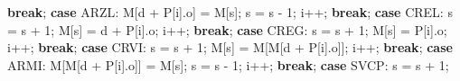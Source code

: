 \documentclass[
  brazilian,
  letterpaper,
]{book}
\newenvironment{Shaded}{\begin{snugshade}}{\end{snugshade}}
\newcommand{\ControlFlowTok}[1]{\textcolor[rgb]{0.00,0.23,0.31}{\textbf{#1}}}
\newcommand{\DecValTok}[1]{\textcolor[rgb]{0.68,0.00,0.00}{#1}}
\newcommand{\NormalTok}[1]{\textcolor[rgb]{0.00,0.23,0.31}{#1}}
\newcommand{\OperatorTok}[1]{\textcolor[rgb]{0.37,0.37,0.37}{#1}}
\theoremstyle{plain}
\theoremstyle{definition}
\theoremstyle{remark}
\begin{document}
\begin{Shaded}
\begin{Highlighting}[]
            \ControlFlowTok{break}\OperatorTok{;}
        \ControlFlowTok{case}\NormalTok{ ARZL}\OperatorTok{:}
\NormalTok{            M}\OperatorTok{[}\NormalTok{d }\OperatorTok{+}\NormalTok{ P}\OperatorTok{[}\NormalTok{i}\OperatorTok{].}\NormalTok{o}\OperatorTok{]} \OperatorTok{=}\NormalTok{ M}\OperatorTok{[}\NormalTok{s}\OperatorTok{];}
\NormalTok{            s }\OperatorTok{=}\NormalTok{ s }\OperatorTok{{-}} \DecValTok{1}\OperatorTok{;}
\NormalTok{            i}\OperatorTok{++;}
            \ControlFlowTok{break}\OperatorTok{;}
        \ControlFlowTok{case}\NormalTok{ CREL}\OperatorTok{:}
\NormalTok{            s }\OperatorTok{=}\NormalTok{ s }\OperatorTok{+} \DecValTok{1}\OperatorTok{;}
\NormalTok{            M}\OperatorTok{[}\NormalTok{s}\OperatorTok{]} \OperatorTok{=}\NormalTok{ d }\OperatorTok{+}\NormalTok{ P}\OperatorTok{[}\NormalTok{i}\OperatorTok{].}\NormalTok{o}\OperatorTok{;}
\NormalTok{            i}\OperatorTok{++;}
            \ControlFlowTok{break}\OperatorTok{;}
        \ControlFlowTok{case}\NormalTok{ CREG}\OperatorTok{:}
\NormalTok{            s }\OperatorTok{=}\NormalTok{ s }\OperatorTok{+} \DecValTok{1}\OperatorTok{;}
\NormalTok{            M}\OperatorTok{[}\NormalTok{s}\OperatorTok{]} \OperatorTok{=}\NormalTok{ P}\OperatorTok{[}\NormalTok{i}\OperatorTok{].}\NormalTok{o}\OperatorTok{;}
\NormalTok{            i}\OperatorTok{++;}
            \ControlFlowTok{break}\OperatorTok{;}
        \ControlFlowTok{case}\NormalTok{ CRVI}\OperatorTok{:}
\NormalTok{            s }\OperatorTok{=}\NormalTok{ s }\OperatorTok{+} \DecValTok{1}\OperatorTok{;}
\NormalTok{            M}\OperatorTok{[}\NormalTok{s}\OperatorTok{]} \OperatorTok{=}\NormalTok{ M}\OperatorTok{[}\NormalTok{M}\OperatorTok{[}\NormalTok{d }\OperatorTok{+}\NormalTok{ P}\OperatorTok{[}\NormalTok{i}\OperatorTok{].}\NormalTok{o}\OperatorTok{]];}
\NormalTok{            i}\OperatorTok{++;}
            \ControlFlowTok{break}\OperatorTok{;}
        \ControlFlowTok{case}\NormalTok{ ARMI}\OperatorTok{:}
\NormalTok{            M}\OperatorTok{[}\NormalTok{M}\OperatorTok{[}\NormalTok{d }\OperatorTok{+}\NormalTok{ P}\OperatorTok{[}\NormalTok{i}\OperatorTok{].}\NormalTok{o}\OperatorTok{]]} \OperatorTok{=}\NormalTok{ M}\OperatorTok{[}\NormalTok{s}\OperatorTok{];}
\NormalTok{            s }\OperatorTok{=}\NormalTok{ s }\OperatorTok{{-}} \DecValTok{1}\OperatorTok{;}
\NormalTok{            i}\OperatorTok{++;}
            \ControlFlowTok{break}\OperatorTok{;}
        \ControlFlowTok{case}\NormalTok{ SVCP}\OperatorTok{:}
\NormalTok{            s }\OperatorTok{=}\NormalTok{ s }\OperatorTok{+} \DecValTok{1}\OperatorTok{;}

\end{Highlighting}
\end{Shaded}
\end{document}
